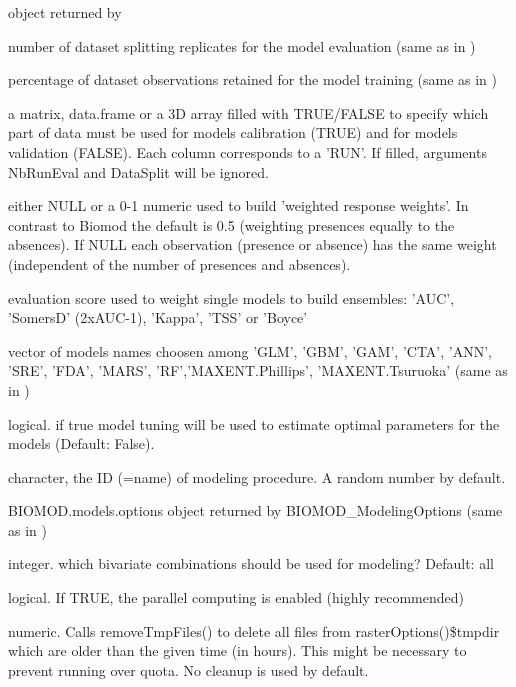 \documentclass[a4paper]{book}
\begin{document}
\begin{Arguments}
\begin{ldescription}
\item[\code{data}]  object returned by 

\item[\code{NbRunEval}] 
number of dataset splitting replicates for the model evaluation (same as in )

\item[\code{DataSplit}] 
percentage of dataset observations retained for the model training (same as in )

\item[\code{DataSplitTable}] 
a matrix, data.frame or a 3D array filled with TRUE/FALSE to specify which part of data must be used for models calibration (TRUE) and for models validation (FALSE). Each column corresponds to a 'RUN'. If filled, arguments NbRunEval and DataSplit  will be ignored.

\item[\code{Prevalence}] 
either NULL or a 0-1 numeric used to build 'weighted response weights'. In contrast to Biomod the default is 0.5 (weighting presences equally to the absences). If NULL each observation (presence or absence) has the same weight (independent of the number of presences and absences).

\item[\code{weighting.score}] 
evaluation score used to weight single models to build ensembles: 'AUC', 'SomersD' (2xAUC-1), 'Kappa', 'TSS' or 'Boyce'

\item[\code{models}] 
vector of models names choosen among 'GLM', 'GBM', 'GAM', 'CTA', 'ANN', 'SRE', 'FDA', 'MARS', 'RF','MAXENT.Phillips', 'MAXENT.Tsuruoka' (same as in )

\item[\code{tune}] 
logical. if true model tuning will be used to estimate optimal parameters for the models (Default: False).
   
\item[\code{modeling.id}] 
character, the ID (=name) of modeling procedure. A random number by default.

\item[\code{models.options}] 
BIOMOD.models.options object returned by BIOMOD\_ModelingOptions (same as in )

\item[\code{which.biva}] 
integer. which bivariate combinations should be used for modeling? Default: all

\item[\code{parallel}] 
logical. If TRUE, the parallel computing is enabled (highly recommended)

\item[\code{cleanup}] 
numeric. Calls removeTmpFiles() to delete all files from rasterOptions()\$tmpdir which are older than the given time (in hours). This might be necessary to prevent running over quota. No cleanup is used by default. 

\end{ldescription}
\end{Arguments}
\end{document}
